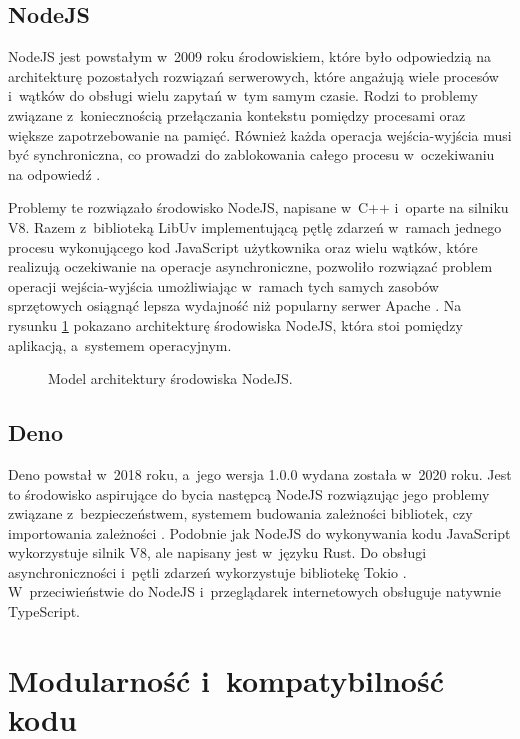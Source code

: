\subsection{NodeJS}

NodeJS jest powstałym w~2009 roku środowiskiem, które było odpowiedzią na architekturę pozostałych rozwiązań serwerowych, które angażują wiele procesów i~wątków do obsługi wielu zapytań w~tym samym czasie. Rodzi to problemy związane z~koniecznością przełączania kontekstu pomiędzy procesami oraz większe zapotrzebowanie na pamięć. Również każda operacja wejścia-wyjścia musi być synchroniczna, co prowadzi do zablokowania całego procesu w~oczekiwaniu na odpowiedź \cite{nodejs}.

Problemy te rozwiązało środowisko NodeJS, napisane w~C++ i~oparte na silniku V8. Razem z~biblioteką LibUv \cite{libuv} implementującą pętlę zdarzeń w~ramach jednego procesu wykonującego kod JavaScript użytkownika oraz wielu wątków, które realizują oczekiwanie na operacje asynchroniczne, pozwoliło rozwiązać problem operacji wejścia-wyjścia umożliwiając w~ramach tych samych zasobów sprzętowych osiągnąć lepsza wydajność niż popularny serwer Apache \cite{node-apache}. Na rysunku \ref{fig:nodejs} pokazano architekturę środowiska NodeJS, która stoi pomiędzy aplikacją, a~systemem operacyjnym.

\begin{figure}[ht]
    \centering
     
    \caption{Model architektury środowiska NodeJS.}
    \label{fig:nodejs}
\end{figure}

\subsection{Deno}

Deno powstał w~2018 roku, a~jego wersja 1.0.0 wydana została w~2020 roku. Jest to środowisko aspirujące do bycia następcą NodeJS rozwiązując jego problemy związane z~bezpieczeństwem, systemem budowania zależności bibliotek, czy importowania zależności \cite{deno}. Podobnie jak NodeJS do wykonywania kodu JavaScript wykorzystuje silnik V8, ale napisany jest w~języku Rust. Do obsługi asynchroniczności i~pętli zdarzeń wykorzystuje bibliotekę Tokio \cite{tokio}. W~przeciwieństwie do NodeJS i~przeglądarek internetowych obsługuje natywnie TypeScript.

\section{Modularność i~kompatybilność kodu}

